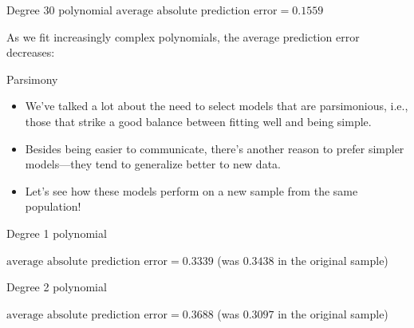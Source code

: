 \documentclass{beamer}\usepackage[]{graphicx}\usepackage[]{color}
\newenvironment{knitrout}{}{} %
\begin{document}
\begin{darkframes}
\begin{frame}{Degree 30 polynomial}
\begin{knitrout}
\end{knitrout}
      \vspace{-1cm} $\text{average absolute prediction error} = 0.1559$
    \end{frame}

    \begin{frame}
      As we fit increasingly complex polynomials, the average prediction error decreases:

\begin{knitrout}


\end{knitrout}
    \end{frame}

    \begin{frame}{Parsimony}
      \begin{itemize}
        \item We've talked a lot about the need to select models that are \alert{parsimonious}, i.e., those that strike a good balance between fitting well and being simple.
        \item Besides being easier to communicate, there's another reason to prefer simpler models---they tend to generalize better to new data.
        \item Let's see how these models perform on a new sample from the same population!
      \end{itemize}
    \end{frame}

    \begin{frame}{Degree 1 polynomial}
\begin{knitrout}


\end{knitrout}
      \vspace{-1cm} $\text{average absolute prediction error} = 0.3339$
      (was $0.3438$ in the original sample)
    \end{frame}

    \begin{frame}{Degree 2 polynomial}
\begin{knitrout}


\end{knitrout}
      \vspace{-1cm} $\text{average absolute prediction error} = 0.3688$
      (was $0.3097$ in the original sample)
    \end{frame}


\end{darkframes}
\end{document}
